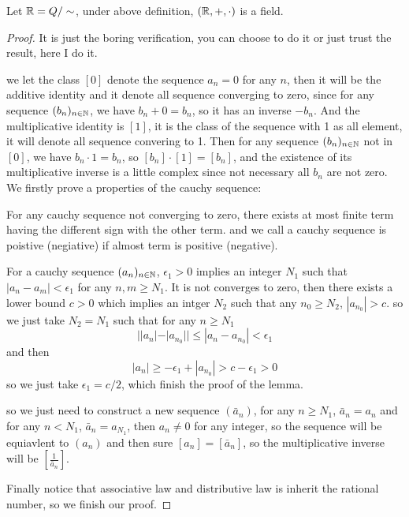 \documentclass[en,geye,blue,normal,12pt]{elegantnote}
\begin{document}
\begin{proposition}
  Let \(\mathbb{R} = Q/\sim\), under above definition, \((\mathbb{R},+,\cdot)\) is a field.

  \begin{proof}
    It is just the boring verification, you can choose to do it or just trust the result, here I do it. 

    we let the class \([0]\) denote the sequence \(a_n = 0\) for any \(n\), then it will be the additive identity and it denote all sequence converging to zero, since for any sequence \((b_n)_{n \in \mathbb{N}}\), we have \(b_n + 0 = b_n\), so it has an inverse \(-b_n\). And the multiplicative identity is \([1]\), it is the class of the sequence with 1 as all element, it will denote all sequence convering to 1. Then for any sequence \((b_n)_{n \in \mathbb{N}}\) not in \([0]\), we have \(b_n \cdot 1 = b_n\), so \([b_n] \cdot [1] = [b_n]\), and the existence of its multiplicative inverse is a little complex since not necessary all \(b_n\) are not zero. We firstly prove a properties of the cauchy sequence:

    \begin{lemma}
      For any cauchy sequence not converging to zero, there exists at most finite term having the different sign with the other term. and we call a cauchy sequence is poistive (negiative) if almost term is positive (negative).
    \end{lemma}

    For a cauchy sequence \((a_n)_{n \in \mathbb{N}}\), \(\epsilon_1 >0\) implies an integer \(N_1\) such that \(|a_n - a_m| < \epsilon_1\) for any \(n,m \geq N_1\). It is not converges to zero, then there exists a lower bound \(c>0\) which implies an intger \(N_2\) such that any \(n_0 \geq N_2\), \(|a_{n_0}| > c\). so we just take \(N_2 = N_1\) such that for any \(n \geq N_1\)
    \[||a_n|-|a_{n_0}|| \leq |a_n-a_{n_0}| < \epsilon_1 \]
    and then 
    \[|a_n| \geq -\epsilon_1+|a_{n_0}| > c -\epsilon_1 > 0\]
    so we just take \(\epsilon_1 = c/2\), which finish the proof of the lemma.

    so we just need to construct a new sequence \((\bar{a}_n)\), for any \(n \geq N_1\), \(\bar{a}_n = a_n\) and for any \(n < N_1\), \(\bar{a}_n = a_{N_1}\),  then \(a_n \neq 0\) for any integer, so the sequence will be equiavlent to \((a_n)\) and then sure 
    \([a_n] = [\bar{a}_n]\), so the multiplicative inverse will be \([\frac{1}{\bar{a}_n}]\).

    Finally notice that associative law and distributive law is inherit the rational number, so we finish our proof.
  \end{proof}
\end{proposition} 
\end{document}
